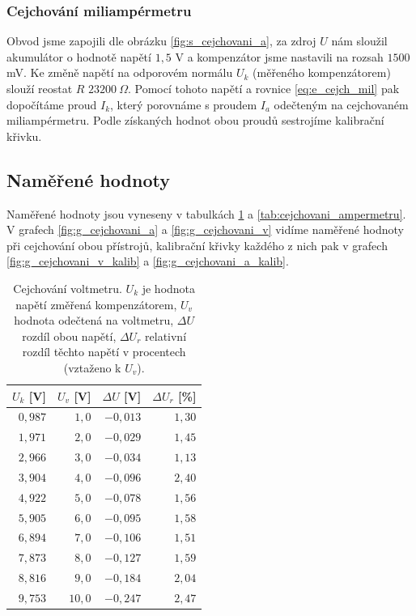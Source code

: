 \documentclass[english]{article}
\begin{document}
\subsubsection{Cejchování miliampérmetru}
Obvod jsme zapojili dle obrázku \ref{fig:s_cejchovani_a}, za zdroj $U$ nám sloužil akumulátor o hodnotě napětí $1,5$ V a kompenzátor jsme nastavili na rozsah $1500$ mV. Ke změně napětí na odporovém normálu $U_k$ (měřeného kompenzátorem) slouží reostat $R$ $23200\ \Omega$. Pomocí tohoto napětí a rovnice \ref{eq:e_cejch_mil} pak dopočítáme proud $I_{k}$, který porovnáme s proudem $I_a$ odečteným na cejchovaném miliampérmetru. Podle získaných hodnot obou proudů sestrojíme kalibrační křivku.

\subsection{Naměřené hodnoty}

Naměřené hodnoty jsou vyneseny v tabulkách \ref{tab:cejchovani_voltmetru} a \ref{tab:cejchovani_ampermetru}. V grafech \ref{fig:g_cejchovani_a} a \ref{fig:g_cejchovani_v} vidíme naměřené hodnoty při cejchování obou přístrojů, kalibrační křivky každého z nich pak v grafech \ref{fig:g_cejchovani_v_kalib} a \ref{fig:g_cejchovani_a_kalib}.

\begin{table}[h]
\begin{center}
\begin{tabular}{|r|r|r|r|}
\hline
   $U_{k}$ [V] & $U_{v}$ [V] & $\Delta U$ [V] & $ \Delta U_{r} $ [\%]\\\hline
   
   $0,987$&$1,0$&$-0,013$&$1,30$\\\hline
   $1,971$&$2,0$&$-0,029$&$1,45$\\\hline
   $2,966$&$3,0$&$-0,034$&$1,13$\\\hline
   $3,904$&$4,0$&$-0,096$&$2,40$\\\hline
   $4,922$&$5,0$&$-0,078$&$1,56$\\\hline
   $5,905$&$6,0$&$-0,095$&$1,58$\\\hline
   $6,894$&$7,0$&$-0,106$&$1,51$\\\hline
   $7,873$&$8,0$&$-0,127$&$1,59$\\\hline
   $8,816$&$9,0$&$-0,184$&$2,04$\\\hline
   $9,753$&$10,0$&$-0,247$&$2,47$\\\hline

\end{tabular}
\caption{Cejchování voltmetru. $U_{k}$ je hodnota napětí změřená kompenzátorem, $U_{v}$ hodnota odečtená na voltmetru, $\Delta U $ rozdíl obou napětí, $ \Delta U_{r} $ relativní rozdíl těchto napětí v procentech (vztaženo k $U_{v}$).}
\label{tab:cejchovani_voltmetru}
\end{center}
\end{table}
\end{document}
